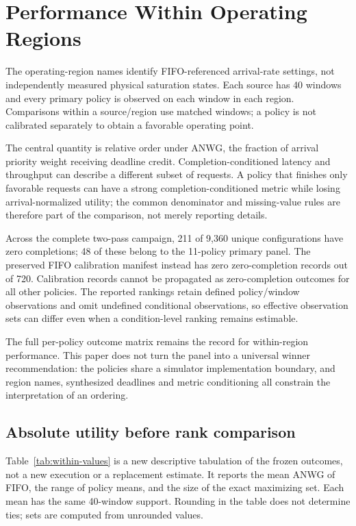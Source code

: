 \section{Performance Within Operating Regions}\label{sec:within}
The operating-region names identify FIFO-referenced arrival-rate settings,
not independently measured physical saturation states. Each source has
40 windows and every primary policy is observed on each window in each
region. Comparisons within a source/region use matched windows; a policy
is not calibrated separately to obtain a favorable operating point.

The central quantity is relative order under ANWG, the fraction of arrival
priority weight receiving deadline credit. Completion-conditioned latency
and throughput can describe a different subset of requests. A policy that
finishes only favorable requests can have a strong completion-conditioned
metric while losing arrival-normalized utility; the common denominator
and missing-value rules are therefore part of the comparison, not merely
reporting details.

Across the complete two-pass campaign, 211 of 9,360 unique configurations
have zero completions; 48 of these belong to the 11-policy primary panel.
The preserved FIFO calibration manifest instead has zero zero-completion records out of 720. Calibration records cannot be propagated as zero-completion
outcomes for all other policies. The reported rankings retain defined
policy/window observations and omit undefined conditional observations,
so effective observation sets can differ even when a condition-level
ranking remains estimable.

The full per-policy outcome matrix remains the record for within-region
performance. This paper does not turn the panel into a universal winner
recommendation: the policies share a simulator implementation boundary,
and region names, synthesized deadlines and metric conditioning all
constrain the interpretation of an ordering.

\subsection{Absolute utility before rank comparison}
Table~\ref{tab:within-values} is a new descriptive tabulation of the frozen
outcomes, not a new execution or a replacement estimate. It reports the
mean ANWG of FIFO, the range of policy means, and the size of the exact
maximizing set. Each mean has the same 40-window support. Rounding in the
table does not determine ties; sets are computed from unrounded values.

